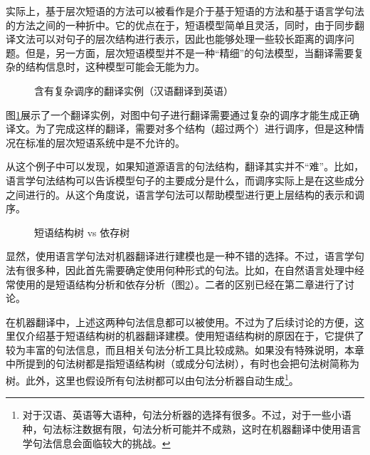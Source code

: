 \parinterval 实际上，基于层次短语的方法可以被看作是介于基于短语的方法和基于语言学句法的方法之间的一种折中。它的优点在于，短语模型简单且灵活，同时，由于同步翻译文法可以对句子的层次结构进行表示，因此也能够处理一些较长距离的调序问题。但是，另一方面，层次短语模型并不是一种“精细”的句法模型，当翻译需要复杂的结构信息时，这种模型可能会无能为力。

\begin{figure}[htp]
\centering

\setlength{\belowcaptionskip}{-0.5em}
\caption{含有复杂调序的翻译实例（汉语翻译到英语）}
\label{fig:8-15}
\end{figure}

\parinterval 图\ref{fig:8-15}展示了一个翻译实例，对图中句子进行翻译需要通过复杂的调序才能生成正确译文。为了完成这样的翻译，需要对多个结构（超过两个）进行调序，但是这种情况在标准的层次短语系统中是不允许的。

\parinterval 从这个例子中可以发现，如果知道源语言的句法结构，翻译其实并不“难”。比如，语言学句法结构可以告诉模型句子的主要成分是什么，而调序实际上是在这些成分之间进行的。从这个角度说，语言学句法可以帮助模型进行更上层结构的表示和调序。

\begin{figure}[htp]
\centering

\setlength{\belowcaptionskip}{-1.0em}
\caption{短语结构树 vs 依存树}
\label{fig:8-16}
\end{figure}

\parinterval 显然，使用语言学句法对机器翻译进行建模也是一种不错的选择。不过，语言学句法有很多种，因此首先需要确定使用何种形式的句法。比如，在自然语言处理中经常使用的是短语结构分析和依存分析（图\ref{fig:8-16}）。二者的区别已经在第二章进行了讨论。

\parinterval 在机器翻译中，上述这两种句法信息都可以被使用。不过为了后续讨论的方便，这里仅介绍基于短语结构树的机器翻译建模。使用短语结构树的原因在于，它提供了较为丰富的句法信息，而且相关句法分析工具比较成熟。如果没有特殊说明，本章中所提到的句法树都是指短语结构树（或成分句法树），有时也会把句法树简称为树。此外，这里也假设所有句法树都可以由句法分析器自动生成\footnote[7]{对于汉语、英语等大语种，句法分析器的选择有很多。不过，对于一些小语种，句法标注数据有限，句法分析可能并不成熟，这时在机器翻译中使用语言学句法信息会面临较大的挑战。}。

